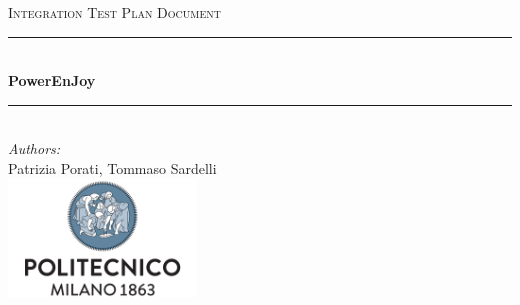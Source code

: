 \documentclass[a4paper,11pt]{article}
\begin{document}
\begin{titlepage}
\begin{center}
\textsc{\LARGE Integration Test Plan Document}\\[1.5cm] %

\rule{\linewidth}{0.5mm} \\[0.7cm]
{\huge \bfseries PowerEnJoy}\\[0.4cm] %
\rule{\linewidth}{0.5mm} \\[1.5cm]
 
\emph{Authors:}\\
Patrizia Porati, Tommaso Sardelli\\[2.0cm] 

\vfill
\vfill
\includegraphics[width=50mm]{polimi.png}\\
\end{center}
\end{titlepage}

\tableofcontents
\pagebreak















\end{document}
